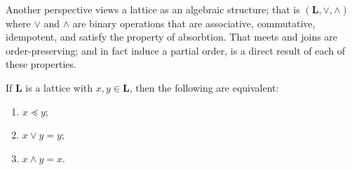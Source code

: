 Another perspective views a lattice as an algebraic structure; that is $(\mathbf{L},\vee, \wedge)$ where $\vee$ and $\wedge$ are binary operations that are associative, commutative, idempotent, and satisfy the property of absorbtion. That meets and joins are order-preserving; and in fact induce a partial order, is a direct result of each of these properties. 

\begin{lemma}
  \label{lemma:the-connecting-lemma}
  If $\mathbf{L}$ is a lattice with $x, y \in \mathbf{L}$, then the following are equivalent:
  \begin{enumerate}
      \setlength\itemsep{0pt}
      \setlength\parsep{0pt}
    \item $x \preceq y$;
    \item $x \vee y = y$;
    \item $x \wedge y = x$.
  \end{enumerate}
\end{lemma}

